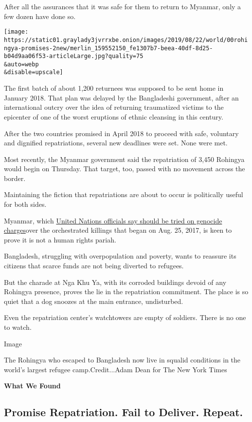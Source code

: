 After all the assurances that it was safe for them to return to Myanmar,
only a few dozen have done so.

\texttt{[image: https://static01.graylady3jvrrxbe.onion/images/2019/08/22/world/00rohingya-promises-2new/merlin\_159552150\_fe1307b7-beea-40df-8d25-b04d9aa06f53-articleLarge.jpg?quality=75\\\&auto=webp\\\&disable=upscale]}

The first batch of about 1,200 returnees was supposed to be sent home in
January 2018. That plan was delayed by the Bangladeshi government, after
an international outcry over the idea of returning traumatized victims
to the epicenter of one of the worst eruptions of ethnic cleansing in
this century.

After the two countries promised in April 2018 to proceed with safe,
voluntary and dignified repatriations, several new deadlines were set.
None were met.

Most recently, the Myanmar government said the repatriation of 3,450
Rohingya would begin on Thursday. That target, too, passed with no
movement across the border.

Maintaining the fiction that repatriations are about to occur is
politically useful for both sides.

Myanmar, which
\href{https://www.nytimes3xbfgragh.onion/2018/08/27/world/asia/myanmar-rohingya-genocide.html}{United
Nations officials say should be tried on genocide charges}over the
orchestrated killings that began on Aug. 25, 2017, is keen to prove it
is not a human rights pariah.

Bangladesh, struggling with overpopulation and poverty, wants to
reassure its citizens that scarce funds are not being diverted to
refugees.

But the charade at Nga Khu Ya, with its corroded buildings devoid of any
Rohingya presence, proves the lie in the repatriation commitment. The
place is so quiet that a dog snoozes at the main entrance, undisturbed.

Even the repatriation center's watchtowers are empty of soldiers. There
is no one to watch.

Image

The Rohingya who escaped to Bangladesh now live in squalid conditions in
the world's largest refugee camp.Credit...Adam Dean for The New York
Times

\textbf{What We Found}

\hypertarget{promise-repatriation-fail-to-deliver-repeat}{%
\subsection{Promise Repatriation. Fail to Deliver.
Repeat.}\label{promise-repatriation-fail-to-deliver-repeat}}

